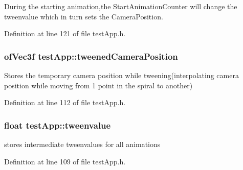 During the starting animation,the Start\-Animation\-Counter will change the tweenvalue which in turn sets the Camera\-Position. 



Definition at line 121 of file test\-App.\-h.

\hypertarget{group___camera_gae9f60797c1c5d9f1ac06e1d6a5259957}{
\subsubsection[{tweened\-Camera\-Position}]{\setlength{\rightskip}{0pt plus 5cm}of\-Vec3f test\-App\-::tweened\-Camera\-Position}}\label{group___camera_gae9f60797c1c5d9f1ac06e1d6a5259957}


Stores the temporary camera position while tweening(interpolating camera position while moving from 1 point in the spiral to another) 



Definition at line 112 of file test\-App.\-h.

\hypertarget{group___camera_gadd9ab1aa902948afbdf1c6db0dfde385}{
\subsubsection[{tweenvalue}]{\setlength{\rightskip}{0pt plus 5cm}float test\-App\-::tweenvalue}}\label{group___camera_gadd9ab1aa902948afbdf1c6db0dfde385}


stores intermediate tweenvalues for all animations 



Definition at line 109 of file test\-App.\-h.

